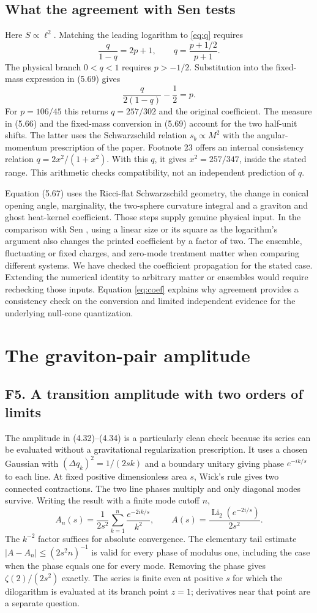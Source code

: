 \documentclass[11pt]{article}
\newcommand{\parttitle}[2]{\clearpage\section{#1}\markboth{#2}{#2}}
\begin{document}
\subsection{What the agreement with Sen tests}
Here $S\propto\ell^2$. Matching the leading logarithm to \eqref{eq:q} requires
\[
 \frac{q}{1-q}=2p+1,\qquad q=\frac{p+1/2}{p+1}.
\]
The physical branch $0<q<1$ requires $p>-1/2$. Substitution into the fixed-mass expression in (5.69) gives
\begin{equation}\label{eq:coef}
 \frac{q}{2(1-q)}-\frac12=p.
\end{equation}
For $p=106/45$ this returns $q=257/302$ and the original coefficient. The measure in (5.66) and the fixed-mass conversion in (5.69) account for the two half-unit shifts. The latter uses the Schwarzschild relation $s_b\propto M^2$ with the angular-momentum prescription of the paper. Footnote 23 offers an internal consistency relation $q=2x^2/(1+x^2)$. With this $q$, it gives $x^2=257/347$, inside the stated range. This arithmetic checks compatibility, not an independent prediction of $q$.

Equation (5.67) uses the Ricci-flat Schwarzschild geometry, the change in conical opening angle, marginality, the two-sphere curvature integral and a graviton and ghost heat-kernel coefficient. Those steps supply genuine physical input. In the comparison with Sen \cite{sen}, using a linear size or its square as the logarithm's argument also changes the printed coefficient by a factor of two. The ensemble, fluctuating or fixed charges, and zero-mode treatment matter when comparing different systems. We have checked the coefficient propagation for the stated case. Extending the numerical identity to arbitrary matter or ensembles would require rechecking those inputs. Equation \eqref{eq:coef} explains why agreement provides a consistency check on the conversion and limited independent evidence for the underlying null-cone quantization.

\parttitle{The graviton-pair amplitude}{The graviton-pair amplitude}
\subsection{F5. A transition amplitude with two orders of limits}
The amplitude in (4.32)--(4.34) is a particularly clean check because its series can be evaluated without a gravitational regularization prescription. It uses a chosen Gaussian with $(\Delta q_k)^2=1/(2sk)$ and a boundary unitary giving phase $e^{-ik/s}$ to each line. At fixed positive dimensionless area $s$, Wick's rule gives two connected contractions. The two line phases multiply and only diagonal modes survive. Writing the result with a finite mode cutoff $n$,
\[
 A_n(s)=\frac1{2s^2}\sum_{k=1}^n \frac{e^{-2ik/s}}{k^2},\qquad
 A(s)=\frac{\operatorname{Li}_2(e^{-2i/s})}{2s^2}.
\]
The $k^{-2}$ factor suffices for absolute convergence. The elementary tail estimate $|A-A_n|\le(2s^2n)^{-1}$ is valid for every phase of modulus one, including the case when the phase equals one for every mode. Removing the phase gives $\zeta(2)/(2s^2)$ exactly. The series is finite even at positive $s$ for which the dilogarithm is evaluated at its branch point $z=1$; derivatives near that point are a separate question.
\end{document}
